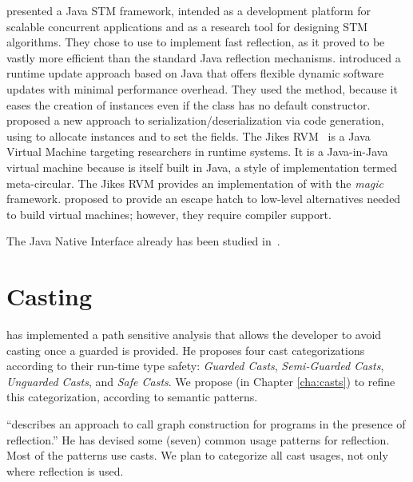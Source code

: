 \cite{korlandNoninvasiveConcurrencyJava2010} presented a Java STM framework, intended as a development platform for scalable concurrent applications and as a research tool for designing STM algorithms.
They chose to use \smu{} to implement fast reflection, as it proved to be vastly more efficient than the standard Java reflection mechanisms.
\cite{pukallFlexibleDynamicSoftware} introduced a runtime update approach based on Java that offers flexible dynamic software updates with minimal performance overhead.
They used the  method, because it eases the creation of instances even if the class has no default constructor.
\cite{gligoricCoDeSeFastDeserialization2011} proposed a new approach to serialization/deserialization via code generation, using \smu{} to allocate instances and to set the fields.
The Jikes RVM~\cite{alpernJikesResearchVirtual2005} is a Java Virtual Machine targeting researchers in runtime systems.
It is a Java-in-Java virtual machine because is itself built in Java, a style of implementation termed meta-circular.
The Jikes RVM provides an implementation of \smu{} with the \emph{magic} framework.
\cite{framptonDemystifyingMagicHighlevel2009} proposed  to provide an escape hatch to low-level alternatives needed to build virtual machines; however, they require compiler support.

The Java Native Interface already has been studied in~\cite{tanSafeJavaNative2006,tanEmpiricalSecurityStudy2008,kondohFindingBugsJava2008,sunNativeGuardProtectingAndroid2014,liFindingBugsExceptional2009}.


\section{Casting}
\label{sec:lr:casting}

\cite{wintherGuardedTypePromotion2011} has implemented a path sensitive analysis that allows the developer to avoid casting once a guarded  is provided.
He proposes four cast categorizations according to their run-time type safety: \emph{Guarded Casts}, \emph{Semi-Guarded Casts}, \emph{Unguarded Casts}, and \emph{Safe Casts}.
We propose (in Chapter \ref{cha:casts}) to refine this categorization, according to semantic patterns.

\cite{livshitsImprovingSoftwareSecurity2006,livshitsReflectionAnalysisJava2005} ``describes an approach to call graph construction for \java{} programs in the presence of reflection.''
He has devised some (seven) common usage patterns for reflection.
Most of the patterns use casts.
We plan to categorize all cast usages, not only where reflection is used.


